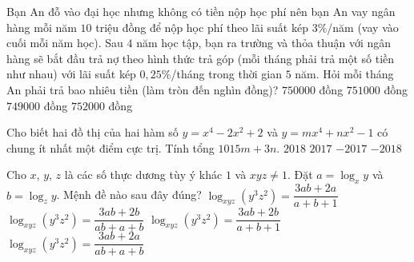 \begin{ex}%
	Bạn An đỗ vào đại học nhưng không có tiền nộp học phí nên bạn An vay ngân hàng mỗi năm $10$ triệu đồng để nộp học phí theo lãi suất kép $3\%$/năm (vay vào cuối mỗi năm học). Sau $4$ năm học tập, bạn ra trường và thỏa thuận với ngân hàng sẽ bắt đầu trả nợ theo hình thức trả góp (mỗi tháng phải trả một số tiền như nhau) với lãi suất kép $0{,}25\%$/tháng trong thời gian $5$ năm. Hỏi mỗi tháng An phải trả bao nhiêu tiền (làm tròn đến nghìn đồng)?
	\choice
	{$750000$ đồng}
	{$751000$ đồng}
	{$749000$ đồng}
	{\True $752000$ đồng}
\end{ex} 

\begin{ex}%
Cho biết hai đồ thị của hai hàm số $y=x^4-2x^2+2$ và $y = mx^4+nx^2-1$ có chung ít nhất một điểm cực trị. Tính tổng $1015m + 3n$.
\choice
{$2018$}
{$2017$}
{$-2017$}
{\True $-2018$}
\end{ex} 
 
\begin{ex}%
Cho $x$, $y$, $z$ là các số thực dương tùy ý khác $1$ và $xyz \neq 1$. Đặt $a = \log_x y$ và $b = \log_z y$. Mệnh đề nào sau đây đúng?
\choice
{$\log_{xyz}(y^3z^2) = \dfrac{3ab+2a}{a+b+1}$}
{$\log_{xyz}(y^3z^2) = \dfrac{3ab+2b}{ab+a+b}$}
{$\log_{xyz}(y^3z^2) = \dfrac{3ab+2b}{a+b+1}$}
{\True $\log_{xyz}(y^3z^2) = \dfrac{3ab+2a}{ab+a+b}$}
\end{ex} 

